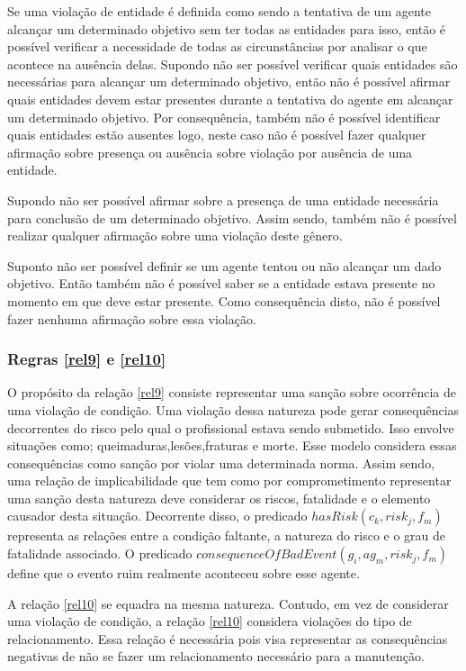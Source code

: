\documentclass[12pt]{article}
\begin{document}
Se uma violação de entidade é definida como sendo a tentativa de um agente alcançar um determinado objetivo sem ter todas as entidades para isso, então é possível verificar a necessidade de todas as circunstâncias por analisar o que acontece na ausência delas. Supondo não ser possível verificar quais entidades são necessárias para alcançar um determinado objetivo, então não é possível afirmar quais entidades devem estar presentes durante a tentativa do agente em alcançar um determinado objetivo. Por consequência, também não é possível identificar quais entidades estão ausentes logo, neste caso não é possível fazer qualquer afirmação sobre presença ou ausência sobre violação por ausência de uma entidade. 

Supondo não ser possível afirmar sobre a presença de uma entidade necessária para conclusão de um determinado objetivo. Assim sendo, também não é possível realizar qualquer afirmação sobre uma violação deste gênero. 

Suponto não ser possível definir se um agente tentou ou não alcançar um dado objetivo. Então também não é possível saber se a entidade estava presente no momento em que deve estar presente. Como consequência disto, não é possível fazer nenhuma afirmação sobre essa violação.


\subsubsection{Regras \ref{rel9} e \ref{rel10}}

O propósito da relação \ref{rel9} consiste representar uma sanção sobre ocorrência de uma violação de condição. Uma violação dessa natureza pode gerar consequências decorrentes do risco pelo qual o profissional estava sendo submetido. Isso envolve situações como; queimaduras,lesões,fraturas e morte. Esse modelo considera essas consequências como sanção por violar uma determinada norma. Assim sendo, uma relação de implicabilidade que tem como por comprometimento representar uma sanção desta natureza deve considerar os riscos, fatalidade e o elemento causador desta situação. Decorrente disso, o predicado $hasRisk(c_k,risk_j,f_m)$ representa as relações entre a condição faltante, a natureza do risco e o grau de fatalidade associado. O predicado $consequenceOfBadEvent(g_i,ag_m,risk_j,f_m)$ define que o evento ruim realmente aconteceu sobre esse agente. 


A relação \ref{rel10} se equadra na mesma natureza. Contudo, em vez de considerar uma violação de condição, a relação \ref{rel10} considera violações do tipo de relacionamento. Essa relação é necessária pois visa representar as consequências negativas de não se fazer um relacionamento necessário para a manutenção. 
\end{document}
